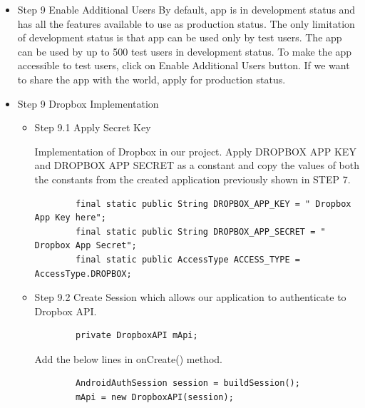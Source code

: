 \documentclass[12pt]{report}
\begin{document}
\begin{itemize}
\item Step 9 Enable Additional Users
By default, app is in development status and has all the features available to use as production
status. The only limitation of development status is that app can be used only by test users. The app
can be used by up to 500 test users in development status. To make the app accessible to test users,
click on Enable Additional Users button. If we want to share the app with the world, apply for
production status.

\item Step 9 Dropbox Implementation

\begin{itemize}

\item Step 9.1 Apply Secret Key


Implementation of Dropbox in our project. Apply
DROPBOX APP KEY
and
DROPBOX APP SECRET
as a constant and copy the values of both the constants from the created application previously shown in STEP 7.

\begin{lstlisting}
        final static public String DROPBOX_APP_KEY = " Dropbox App Key here";
        final static public String DROPBOX_APP_SECRET = " Dropbox App Secret";
        final static public AccessType ACCESS_TYPE = AccessType.DROPBOX;
\end{lstlisting}
\item Step 9.2
Create Session which allows our application to authenticate to Dropbox API.
\begin{lstlisting}
        private DropboxAPI mApi;
\end{lstlisting}

Add the below lines in onCreate() method.
\begin{lstlisting}
        AndroidAuthSession session = buildSession();
        mApi = new DropboxAPI(session);


\end{lstlisting}
\end{itemize}
\end{itemize}
\end{document}
